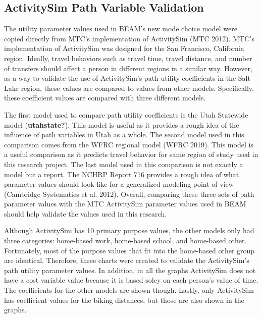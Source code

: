 \documentclass[12pt, oneside, openright]{byuthesis}
\begin{document}
\hypertarget{activitysim-path-variable-validation}{%
\subsection{ActivitySim Path Variable Validation}\label{activitysim-path-variable-validation}}

The utility parameter values used in BEAM's new mode choice model were copied directly from MTC's implementation of ActivitySim (MTC 2012). MTC's implementation of ActivitySim was designed for the San Francisco, California region. Ideally, travel behaviors such as travel time, travel distance, and number of transfers should affect a person in different regions in a similar way. However, as a way to validate the use of ActivitySim's path utility coefficients in the Salt Lake region, these values are compared to values from other models. Specifically, these coefficient values are compared with three different models.

The first model used to compare path utility coefficients is the Utah Statewide model (\textbf{utahstate?}). This model is useful as it provides a rough idea of the influence of path variables in Utah as a whole. The second model used in this comparison comes from the WFRC regional model (WFRC 2019). This model is a useful comparison as it predicts travel behavior for same region of study used in this research project. The last model used in this comparison is not exactly a model but a report. The NCHRP Report 716 provides a rough idea of what parameter values should look like for a generalized modeling point of view (Cambridge Systematics et al. 2012). Overall, comparing these three sets of path parameter values with the MTC ActivitySim parameter values used in BEAM should help validate the values used in this research.

Although ActivitySim has 10 primary purpose values, the other models only had three categories: home-based work, home-based school, and home-based other. Fortunately, most of the purpose values that fit into the home-based other group are identical. Therefore, three charts were created to validate the ActivitySim's path utility parameter values. In addition, in all the graphs ActivitySim does not have a cost variable value because it is based soley on each person's value of time. The coefficients for the other models are shown though. Lastly, only ActivitySim has coefficient values for the biking distances, but those are also shown in the graphs.
\end{document}
